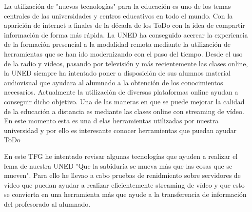 \documentclass[../main.tex]{subfiles}
\begin{document}
La utilización de "nuevas tecnologías" para la educación es uno de los temas centrales de las universidades y centros educativos en todo el mundo. Con la aparición de internet a finales de la década de los ToDo con la idea de compartir información de forma más rápida. La UNED ha conseguido acercar la experiencia de la formación presencial a la modalidad remota mediante la utilización de herramientas que se han ido modernizando con el paso del tiempo. Desde el uso de la radio y vídeos, pasando por televisión y más recientemente las clases online, la UNED siempre ha intentado poner a disposición de sus alumnos material audiovisual que ayudara al alumnado a la obtención de los conocimientos necesarios. Actualmente la utilización de diversas plataformas online ayudan a conseguir dicho objetivo. Una de las maneras en que se puede mejorar la calidad de la educación a distancia es mediante las clases online con streaming de vídeo. En este momento esta es una d elas herramientas utilizadas por nuestra universidad y por ello es interesante conocer herramientas que puedan ayudar ToDo

En este TFG he intentado revisar algunas tecnologías que ayuden a realizar el lema de nuestra UNED "Que la sabiduría se mueva más que las cosas que se mueven". Para ello he llevao a cabo pruebas de renidmiento sobre servidores de vídeo que puedan ayudar a realizar eficientemente streaming de vídeo y que esto se convierta en una herramienta más que ayude a la transferencia de información del profesorado al alumnado.
\end{document}
